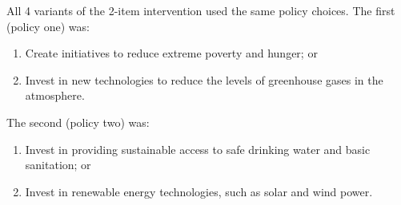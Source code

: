 All 4 variants of the 2-item intervention used the same policy choices. The
first (policy one) was:
\begin{enumerate}
    \item Create initiatives to reduce extreme poverty and hunger; or
    \item Invest in new technologies to reduce the levels of greenhouse gases in the atmosphere.
\end{enumerate}

The second (policy two) was:
\begin{enumerate}
    \item Invest in providing sustainable access to safe drinking water and basic sanitation; or
    \item Invest in renewable energy technologies, such as solar and wind power.
\end{enumerate}
